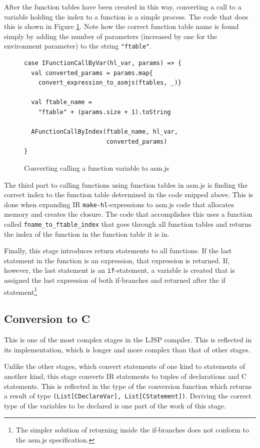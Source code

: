 \documentclass[11pt]{report}
\begin{document}
After the function tables have been created in this way, converting a call to a variable holding the index to a function is a simple process. The code that does this is shown in Figure \ref{iconvasmjs2}. Note how the correct function table name is found simply by adding the number of parameters (increased by one for the environment parameter) to the string \texttt{"ftable"}.

\begin{figure}[ht]
\begin{lstlisting}
case IFunctionCallByVar(hl_var, params) => {
  val converted_params = params.map{
    convert_expression_to_asmjs(ftables, _)}
    
  val ftable_name = 
    "ftable" + (params.size + 1).toString
    
  AFunctionCallByIndex(ftable_name, hl_var, 
                       converted_params)
}
\end{lstlisting}
\caption{Converting calling a function variable to asm.js}
\label{iconvasmjs2}
\end{figure}

The third part to calling functions using function tables in asm.js is finding the correct index to the function table determined in the code snipped above. This is done when expanding IR \texttt{make-hl}-expressions to asm.js code that allocates memory and creates the closure. The code that accomplishes this uses a function called \texttt{fname_to_ftable_index} that goes through all function tables and returns the index of the function in the function table it is in.

Finally, this stage introduces return statements to all functions. If the last statement in the function is an expression, that expression is returned. If, however, the last statement is an \texttt{if}-statement, a variable is created that is assigned the last expression of both if-branches and returned after the if statement\footnote{The simpler solution of returning inside the if-branches does not conform to the asm.js specification.}

\subsection{Conversion to C}
This is one of the most complex stages in the LJSP compiler. This is reflected in its implementation, which is longer and more complex than that of other stages.

Unlike the other stages, which convert statements of one kind to statements of another kind, this stage converts IR statements to tuples of declarations and C statements. This is reflected in the type of the conversion function which returns a result of type \texttt{(List[CDeclareVar], List[CStatement])}. Deriving the correct type of the variables to be declared is one part of the work of this stage.
\end{document}
